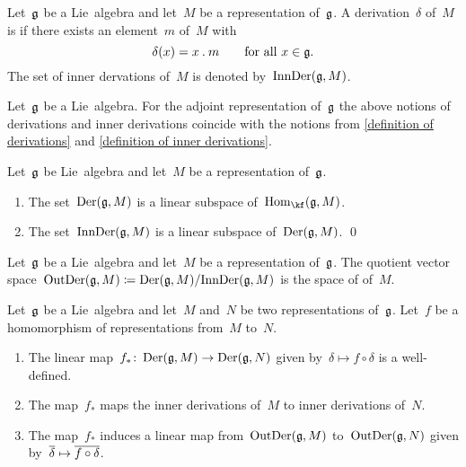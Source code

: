 \begin{definition}
  Let~$\mathfrak{g}$ be a Lie~algebra and let~$M$ be a representation of~$\mathfrak{g}$.
  A derivation~$\delta$ of~$M$ is  if there exists an element~$m$ of~$M$ with
  \[
    \delta(x) = x \mathbin{.} m
    \qquad
    \text{for all~$x \in \mathfrak{g}$.}
  \]
  The set of inner dervations of~$M$ is denoted by~$\operatorname{InnDer}(\mathfrak{g}, M)$.
\end{definition}


\begin{remark}
  Let~$\mathfrak{g}$ be a Lie~algebra.
  For the adjoint representation of~$\mathfrak{g}$ the above notions of derivations and inner derivations coincide with the notions from \cref{definition of derivations} and \cref{definition of inner derivations}.
\end{remark}


\begin{proposition}
  Let~$\mathfrak{g}$ be Lie~algebra and let~$M$ be a representation of~$\mathfrak{g}$.
  \begin{enumerate}
    \item
      The set~$\operatorname{Der}(\mathfrak{g}, M)$ is a linear subspace of~$\Hom_{\kf}(\glie, M)$.
    \item
      The set~$\operatorname{InnDer}(\mathfrak{g}, M)$ is a linear subspace of~$\operatorname{Der}(\mathfrak{g}, M)$.
    \qed
  \end{enumerate}
\end{proposition}


\begin{definition}
  Let~$\mathfrak{g}$ be a Lie~algebra and let~$M$ be a representation of~$\mathfrak{g}$.
  The quotient vector space~$\operatorname{OutDer}(\mathfrak{g}, M) \coloneqq \operatorname{Der}(\mathfrak{g}, M) / { \operatorname{InnDer}(\mathfrak{g}, M) }$ is the space of  of~$M$.
\end{definition}


\begin{proposition}
  \label{functiorality of outer derivations}
  Let~$\mathfrak{g}$ be a Lie~algebra and let~$M$ and~$N$ be two representations of~$\mathfrak{g}$.
  Let~$f$ be a homomorphism of representations from~$M$ to~$N$.
  \begin{enumerate}
    \item
      The linear map~$f_* \colon \Der(\glie, M) \to \Der(\glie, N)$ given by~$\delta \mapsto f \circ \delta$ is a well-defined.
    \item
      The map~$f_*$ maps the inner derivations of~$M$ to inner derivations of~$N$.
    \item
      The map~$f_*$ induces a linear map from~$\operatorname{OutDer}(\mathfrak{g}, M)$ to~$\operatorname{OutDer}(\mathfrak{g}, N)$ given by~$\class{\delta} \mapsto \class{f \circ \delta}$.
  \end{enumerate}
\end{proposition}


